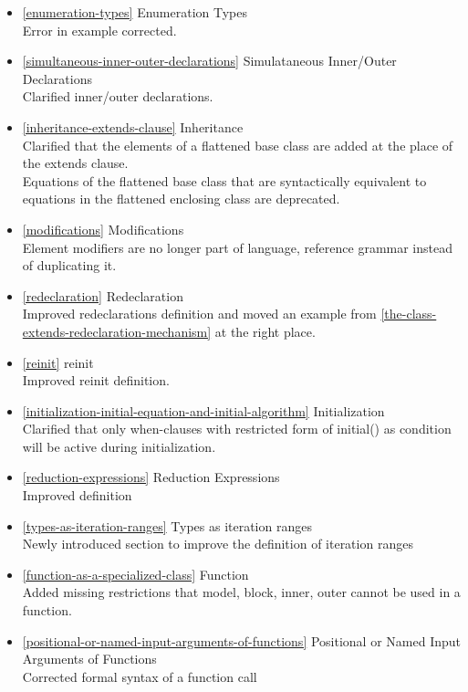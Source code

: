 \begin{itemize}
\item
  \autoref{enumeration-types} Enumeration Types\\
  Error in example corrected.
\item
  \autoref{simultaneous-inner-outer-declarations} Simulataneous Inner/Outer Declarations\\
  Clarified inner/outer declarations.
\item
  \autoref{inheritance-extends-clause} Inheritance\\
  Clarified that the elements of a flattened base class are added at the
  place of the extends clause.\\
  Equations of the flattened base class that are syntactically
  equivalent to equations in the flattened enclosing class are
  deprecated.
\item
  \autoref{modifications} Modifications\\
  Element modifiers are no longer part of language, reference grammar
  instead of duplicating it.
\item
  \autoref{redeclaration} Redeclaration\\
  Improved redeclarations definition and moved an example from \autoref{the-class-extends-redeclaration-mechanism} at
  the right place.
\item
  \autoref{reinit} reinit\\
  Improved reinit definition.
\item
  \autoref{initialization-initial-equation-and-initial-algorithm} Initialization\\
  Clarified that only when-clauses with restricted form of initial() as
  condition will be active during initialization.
\item
  \autoref{reduction-expressions} Reduction Expressions\\
  Improved definition
\item
  \autoref{types-as-iteration-ranges} Types as iteration ranges\\
  Newly introduced section to improve the definition of iteration ranges
\item
  \autoref{function-as-a-specialized-class} Function\\
  Added missing restrictions that model, block, inner, outer cannot be
  used in a function.
\item
  \autoref{positional-or-named-input-arguments-of-functions} Positional or Named Input Arguments of Functions\\
  Corrected formal syntax of a function call

\end{itemize}
